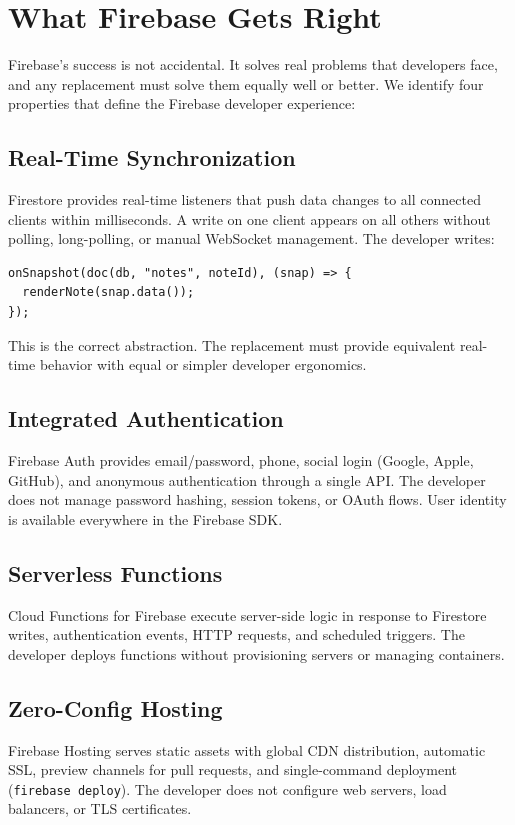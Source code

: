 \section{What Firebase Gets Right}
\label{sec:right}

Firebase's success is not accidental. It solves real problems that
developers face, and any replacement must solve them equally well or
better. We identify four properties that define the Firebase developer
experience:

\subsection{Real-Time Synchronization}

Firestore provides real-time listeners that push data changes to all
connected clients within milliseconds. A write on one client appears
on all others without polling, long-polling, or manual WebSocket
management. The developer writes:

\begin{lstlisting}
onSnapshot(doc(db, "notes", noteId), (snap) => {
  renderNote(snap.data());
});
\end{lstlisting}

This is the correct abstraction. The replacement must provide equivalent
real-time behavior with equal or simpler developer ergonomics.

\subsection{Integrated Authentication}

Firebase Auth provides email/password, phone, social login (Google, Apple,
GitHub), and anonymous authentication through a single API. The developer
does not manage password hashing, session tokens, or OAuth flows. User
identity is available everywhere in the Firebase SDK.

\subsection{Serverless Functions}

Cloud Functions for Firebase execute server-side logic in response to
Firestore writes, authentication events, HTTP requests, and scheduled
triggers. The developer deploys functions without provisioning servers
or managing containers.

\subsection{Zero-Config Hosting}

Firebase Hosting serves static assets with global CDN distribution,
automatic SSL, preview channels for pull requests, and single-command
deployment (\texttt{firebase deploy}). The developer does not configure
web servers, load balancers, or TLS certificates.


